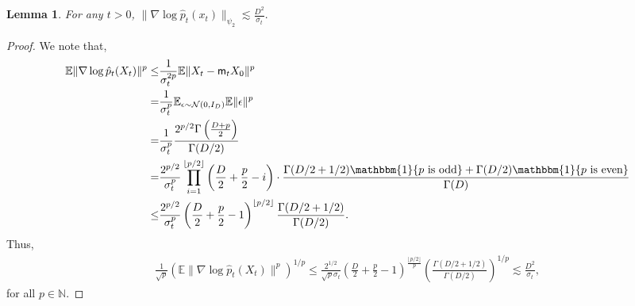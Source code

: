 \documentclass[12pts]{article}
\newtheorem{lemma}[defn]{Lemma}%
\newcommand{\one}{\mathbbm{1}}
\newcommand{\cN}{ \mathcal{N}}
\newcommand{\E}{\mathbb{E}}
\newcommand{\fN}{\mathbb{N}}
\newcommand{\hp}{\hat{p}}
\begin{document}
\begin{lemma}\label{lem:5}
For any $t > 0$,    \(\|\nabla \log \hp_t(x_t)\|_{\psi_2} \lesssim \frac{D^2}{\sigma_t}. \)
\end{lemma}
\begin{proof}
    We note that,
    \begingroup
    \allowdisplaybreaks
    \begin{align*}
         \E \|\nabla \log \hp_t(X_t)\|^p 
        \le & \frac{1}{\sigma_t^{2p}} \E \|X_t - \mathsf{m}_t X_0\|^p\\
         = & \frac{1}{\sigma_t^p} \E_{\epsilon \sim \cN(0, I_D)} \E \|\epsilon\|^p\\
         = & \frac{1}{\sigma_t^p} \frac{2^{p/2} \Gamma\left(\frac{D+p}{2}\right)}{\Gamma(D/2)}\\
         = & \frac{2^{p/2}}{\sigma_t^p} \prod_{i=1}^{\lfloor p/2 \rfloor} \left(\frac{D}{2} + \frac{p}{2} - i\right) \cdot \frac{\Gamma(D/2+1/2) \one\{p \text{ is odd}\} + \Gamma(D/2) \one\{p \text{ is even}\}}{\Gamma(D)}\\
         \le & \frac{2^{p/2}}{\sigma_t^p} \left(\frac{D}{2} + \frac{p}{2} - 1\right)^{\lfloor p/2 \rfloor}\frac{\Gamma(D/2+1/2)}{\Gamma(D/2)}.
    \end{align*}
    \endgroup
    Thus,
\begin{align*}
   \frac{1}{\sqrt{p}} \left( \E \|\nabla \log \hp_t(X_t)\|^p\right)^{1/p} \le \frac{2^{1/2}}{\sqrt{p }\sigma_t} \left(\frac{D}{2} + \frac{p}{2} - 1\right)^{\frac{\lfloor p/2 \rfloor}{p}} \left(\frac{\Gamma(D/2+1/2)}{\Gamma(D/2)}\right)^{1/p} \lesssim \frac{D^2}{\sigma_t}, 
\end{align*}
for all $ p \in \fN.$
\end{proof}
\end{document}
